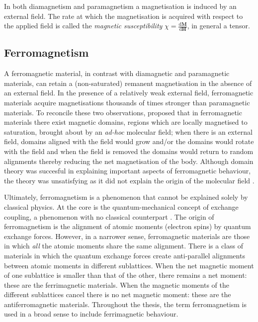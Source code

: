 In both diamagnetism and paramagnetism a magnetisation is induced by an external field. The rate at which the magnetisation is acquired with respect to the applied field is called the \textit{magnetic susceptibility} $\chi = \frac{\text{d}\boldsymbol{M}}{\text{d}\boldsymbol{H}}$, in general a tensor.\par

\subsection{Ferromagnetism}
A ferromagnetic material, in contrast with diamagnetic and paramagnetic materials, can retain a (non-saturated) remanent magnetisation in the absence of an external field. In the presence of a relatively weak external field, ferromagnetic materials acquire magnetisations thousands of times stronger than paramagnetic materials. To reconcile these two observations, \cite{Weiss1906} proposed that in ferromagnetic materials there exist magnetic domains, regions which are locally magnetised to saturation, brought about by an \emph{ad-hoc} molecular field; when there is an external field, domains aligned with the field would grow and/or the domains would rotate with the field and when the field is removed the domains would return to random alignments thereby reducing the net magnetisation of the body. Although domain theory was succesful in explaining important aspects of ferromagnetic behaviour, the theory was unsatisfying as it did not explain the origin of the molecular field \citep{Kittel1949}.

Ultimately, ferromagnetism is a phenomenon that cannot be explained solely by classical physics. At the core is the quantum-mechanical concept of exchange coupling, a phenomenon with no classical counterpart \citep{Heisenberg1926}. The origin of ferromagnetism is the alignment of atomic moments (electron spins) by quantum exchange forces. However, in a narrower sense, ferromagnetic materials are those in which \emph{all} the atomic moments share the same alignment. There is a class of materials in which the quantum exchange forces create anti-parallel alignments between atomic moments in different sublattices. When the net magnetic moment of one sublattice is smaller than that of the other, there remains a net moment: these are the ferrimagnetic materials. When the magnetic moments of the different sublattices cancel there is no net magnetic moment: these are the antiferromagnetic materials. Throughout the thesis, the term ferromagnetism is used in a broad sense to include ferrimagnetic behaviour.\par

